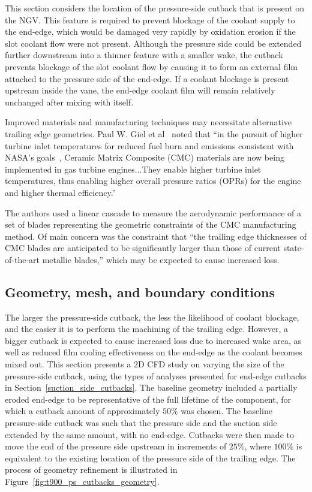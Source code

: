 \documentclass[a4paper, 11pt, oneside]{report}
\begin{document}
This section considers the location of the pressure-side cutback that is present on the NGV. This feature is required to prevent blockage of the coolant supply to the end-edge, which would be damaged very rapidly by oxidation erosion if the slot coolant flow were not present. Although the pressure side could be extended further downstream into a thinner feature with a smaller wake, the cutback prevents blockage of the slot coolant flow by causing it to form an external film attached to the pressure side of the end-edge. If a coolant blockage is present upstream inside the vane, the end-edge coolant film will remain relatively unchanged after mixing with itself.

Improved materials and manufacturing techniques may necessitate alternative trailing edge geometries. Paul W. Giel et al~\cite{giel_te_thickness} noted that ``in the pursuit of higher turbine inlet temperatures for reduced fuel burn and emissions consistent with NASA's goals~\cite{giel_nasa_reference}, Ceramic Matrix Composite (CMC) materials are now being implemented in gas turbine engines...They enable higher turbine inlet temperatures, thus enabling higher overall pressure ratios (OPRs) for the engine and higher thermal efficiency.'' 

The authors used a linear cascade to measure the aerodynamic performance of a set of blades representing the geometric constraints of the CMC manufacturing method. Of main concern was the constraint that ``the trailing edge thicknesses of CMC blades are anticipated to be significantly larger than those of current state-of-the-art metallic blades,'' which may be expected to cause increased loss.

\subsection{Geometry, mesh, and boundary conditions}

The larger the pressure-side cutback, the less the likelihood of coolant blockage, and the easier it is to perform the machining of the trailing edge. However, a bigger cutback is expected to cause increased loss due to increased wake area, as well as reduced film cooling effectiveness on the end-edge as the coolant becomes mixed out. This section presents a 2D CFD study on varying the size of the pressure-side cutback, using the types of analyses presented for end-edge cutbacks in Section~\ref{suction_side_cutbacks}. The baseline geometry included a partially eroded end-edge to be representative of the full lifetime of the component, for which a cutback amount of approximately $50\%$ was chosen. The baseline pressure-side cutback was such that the pressure side and the suction side extended by the same amount, with no end-edge. Cutbacks were then made to move the end of the pressure side upstream in increments of $25\%$, where $100\%$ is equivalent to the existing location of the pressure side of the trailing edge. The process of geometry refinement is illustrated in Figure~\ref{fig:t900_ps_cutbacks_geometry}.
\end{document}
